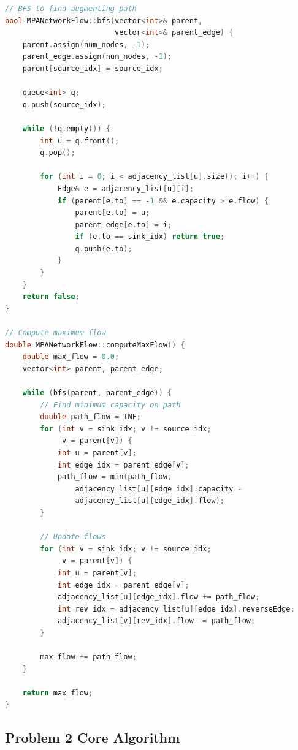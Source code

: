 \documentclass[sigconf,nonacm]{acmart}
\begin{document}
\begin{lstlisting}[language=C++, caption=Edmonds-Karp Max Flow]
// BFS to find augmenting path
bool MPANetworkFlow::bfs(vector<int>& parent,
                         vector<int>& parent_edge) {
    parent.assign(num_nodes, -1);
    parent_edge.assign(num_nodes, -1);
    parent[source_idx] = source_idx;

    queue<int> q;
    q.push(source_idx);

    while (!q.empty()) {
        int u = q.front();
        q.pop();

        for (int i = 0; i < adjacency_list[u].size(); i++) {
            Edge& e = adjacency_list[u][i];
            if (parent[e.to] == -1 && e.capacity > e.flow) {
                parent[e.to] = u;
                parent_edge[e.to] = i;
                if (e.to == sink_idx) return true;
                q.push(e.to);
            }
        }
    }
    return false;
}

// Compute maximum flow
double MPANetworkFlow::computeMaxFlow() {
    double max_flow = 0.0;
    vector<int> parent, parent_edge;

    while (bfs(parent, parent_edge)) {
        // Find minimum capacity on path
        double path_flow = INF;
        for (int v = sink_idx; v != source_idx;
             v = parent[v]) {
            int u = parent[v];
            int edge_idx = parent_edge[v];
            path_flow = min(path_flow,
                adjacency_list[u][edge_idx].capacity -
                adjacency_list[u][edge_idx].flow);
        }

        // Update flows
        for (int v = sink_idx; v != source_idx;
             v = parent[v]) {
            int u = parent[v];
            int edge_idx = parent_edge[v];
            adjacency_list[u][edge_idx].flow += path_flow;
            int rev_idx = adjacency_list[u][edge_idx].reverseEdge;
            adjacency_list[v][rev_idx].flow -= path_flow;
        }

        max_flow += path_flow;
    }

    return max_flow;
}
\end{lstlisting}

\subsection{Problem 2 Core Algorithm}
\end{document}

